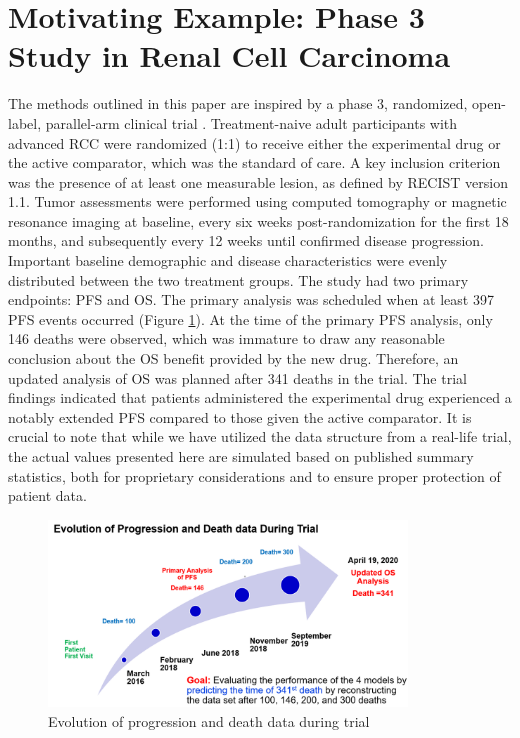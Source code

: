 \documentclass[aoas]{imsart}
\theoremstyle{plain}
\theoremstyle{remark}
\begin{document}
\section{Motivating Example: Phase 3 Study in Renal Cell Carcinoma} \label{sec:example}
The methods outlined in this paper are inspired by a phase 3, randomized, open-label, parallel-arm clinical trial \citep{motzer2019avelumab}. Treatment-naive adult participants with advanced RCC were randomized (1:1) to receive either the experimental drug or the active comparator, which was the standard of care. A key inclusion criterion was the presence of at least one measurable lesion, as defined by RECIST version 1.1. Tumor assessments were performed using computed tomography or magnetic resonance imaging at baseline, every six weeks post-randomization for the first 18 months, and subsequently every 12 weeks until confirmed disease progression. Important baseline demographic and disease characteristics were evenly distributed between the two treatment groups. The study had two primary endpoints: PFS and OS. The primary analysis was scheduled when at least 397 PFS events occurred (Figure \ref{fig:evolution}). At the time of the primary PFS analysis, only 146 deaths were observed, which was immature to draw any reasonable conclusion about the OS benefit provided by the new drug. Therefore, an updated analysis of OS was planned after 341 deaths in the trial. The trial findings indicated that patients administered the experimental drug experienced a notably extended PFS compared to those given the active comparator. It is crucial to note that while we have utilized the data structure from a real-life trial, the actual values presented here are simulated based on published summary statistics, both for proprietary considerations and to ensure proper protection of patient data.

\begin{figure}
    \centering
    \includegraphics[width=0.85\textwidth]{img/Evolution.png}
    \caption{Evolution of progression and death data during trial\label{fig:evolution}}
\end{figure}
\end{document}
